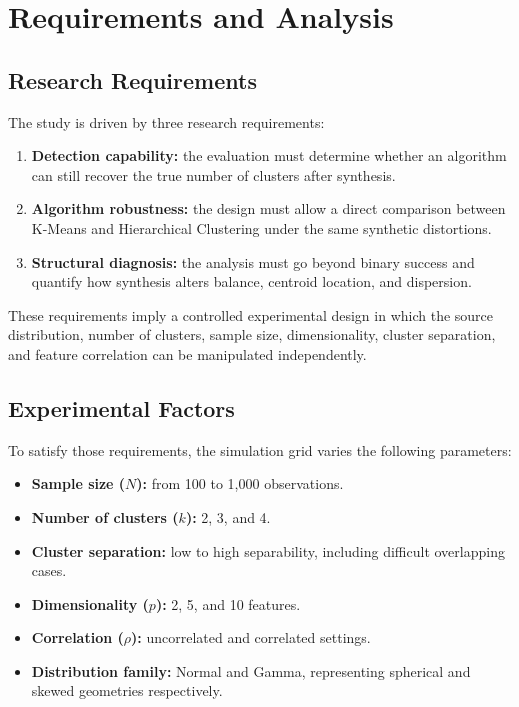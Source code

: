 \chapter{Requirements and Analysis}
\label{chap:requirements-analysis}

\section{Research Requirements}
\label{sec:research-requirements}

The study is driven by three research requirements:
\begin{enumerate}
  \item \textbf{Detection capability:} the evaluation must determine whether an algorithm can still recover the true number of clusters after synthesis.
  \item \textbf{Algorithm robustness:} the design must allow a direct comparison between K-Means and Hierarchical Clustering under the same synthetic distortions.
  \item \textbf{Structural diagnosis:} the analysis must go beyond binary success and quantify how synthesis alters balance, centroid location, and dispersion.
\end{enumerate}

These requirements imply a controlled experimental design in which the source distribution, number of clusters, sample size, dimensionality, cluster separation, and feature correlation can be manipulated independently.

\section{Experimental Factors}
\label{sec:experimental-factors}

To satisfy those requirements, the simulation grid varies the following parameters:
\begin{itemize}
  \item \textbf{Sample size ($N$):} from 100 to 1,000 observations.
  \item \textbf{Number of clusters ($k$):} 2, 3, and 4.
  \item \textbf{Cluster separation:} low to high separability, including difficult overlapping cases.
  \item \textbf{Dimensionality ($p$):} 2, 5, and 10 features.
  \item \textbf{Correlation ($\rho$):} uncorrelated and correlated settings.
  \item \textbf{Distribution family:} Normal and Gamma, representing spherical and skewed geometries respectively.
\end{itemize}

